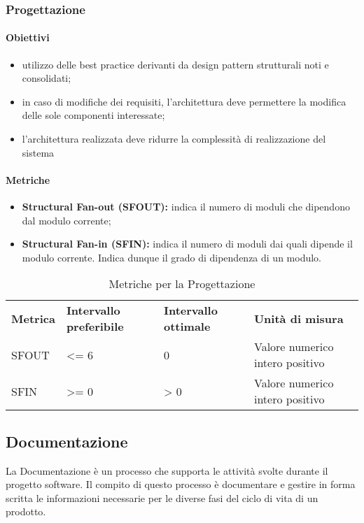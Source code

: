 \subsubsection{Progettazione}
\paragraph{Obiettivi}
\begin{itemize}
	\item utilizzo delle best practice derivanti da design pattern strutturali noti e consolidati;
	\item in caso di modifiche dei requisiti, l'architettura deve permettere la modifica delle sole componenti interessate;
	\item l'architettura realizzata deve ridurre la complessità di realizzazione del sistema 
\end{itemize}
\paragraph{Metriche}
\begin{itemize}
	\item \textbf{Structural Fan-out (SFOUT):} indica il numero di moduli che dipendono dal modulo corrente;
	\item \textbf{Structural Fan-in (SFIN):} indica il numero di moduli dai quali dipende il modulo corrente. Indica dunque il grado di dipendenza di un modulo.
\end{itemize}

\renewcommand{\arraystretch}{2.2}
\begin{longtable}{|C{4.5cm}|C{2.25cm}|C{2.25cm}|C{3cm}|}
	
	\caption{Metriche per la Progettazione}\\
	\hline
	
	\textbf{Metrica} & \textbf{Intervallo preferibile}  & \textbf{Intervallo ottimale} & \textbf{Unità di misura}
	\tabularnewline
	\endfirsthead
	
	SFOUT & <= 6  & 0 & Valore numerico intero positivo \\ 
	SFIN &  >= 0 & > 0 & Valore numerico intero positivo \\ 
\end{longtable}




\subsection{Documentazione}
La Documentazione è un processo che supporta le attività svolte durante il progetto software. Il compito di questo processo è documentare e gestire in forma scritta le informazioni necessarie per le diverse fasi del ciclo di vita di un prodotto.
